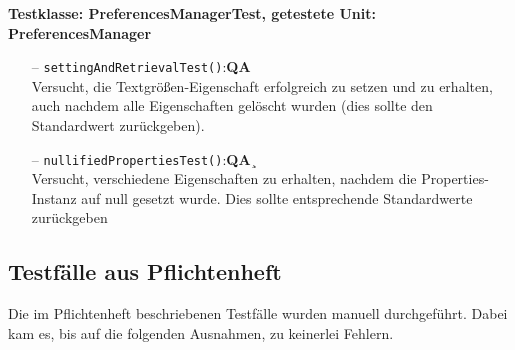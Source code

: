 \documentclass[parskip=full,11pt,twoside]{scrartcl}
\def\qa{\hfill\textbf{QA}}
\begin{document}
\textbf{Testklasse: PreferencesManagerTest, getestete Unit: PreferencesManager}
\begin{itemize}
	\item[--] \texttt{settingAndRetrievalTest()}:\qa\\
	Versucht, die Textgrößen-Eigenschaft erfolgreich zu setzen und zu erhalten, auch nachdem alle Eigenschaften gelöscht wurden (dies sollte den Standardwert zurückgeben).
	\item[--] \texttt{nullifiedPropertiesTest()}:\qa¸\\
	Versucht, verschiedene Eigenschaften zu erhalten, nachdem die Properties-Instanz auf null gesetzt wurde. Dies sollte entsprechende Standardwerte zurückgeben
\end{itemize}

\subsection{Testfälle aus Pflichtenheft}

Die im Pflichtenheft beschriebenen Testfälle wurden manuell durchgeführt. Dabei kam es, bis auf die folgenden Ausnahmen, zu keinerlei Fehlern.
\end{document}
